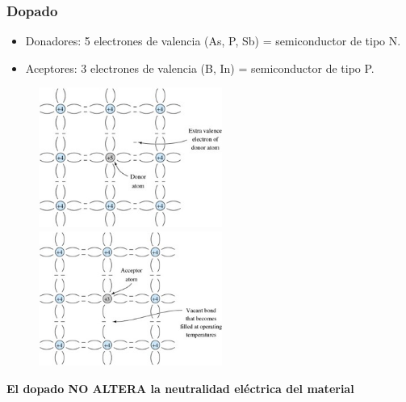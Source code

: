 \documentclass[10pt,t,aspectratio=169]{beamer}
\begin{document}
\begin{frame}[t]
  \frametitle{Dopado}

  \begin{itemize}
    \item Donadores: 5 electrones de valencia  (As, P, Sb) = semiconductor de tipo N.
    \item Aceptores: 3 electrones de valencia (B, In) = semiconductor de tipo P.   
  \end{itemize}

  \begin{figure}[H]
    \centering
    \includegraphics[width=6cm]{./figures/dopado3.jpg}
    \hspace{1cm}
    \includegraphics[width=6cm]{./figures/dopado4.jpg}
  \end{figure}

  \centering
  \textbf{El dopado NO ALTERA la neutralidad eléctrica del material}
\end{frame}
\end{document}
